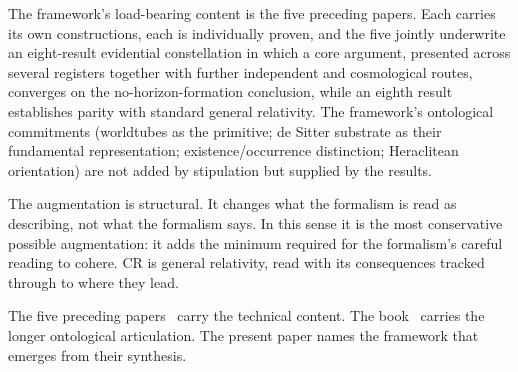 \documentclass[11pt,a4paper]{article}
\theoremstyle{definition}
\begin{document}
The framework's load-bearing content is the five preceding papers. Each carries its own constructions, each is individually proven, and the five jointly underwrite an eight-result evidential constellation in which a core argument, presented across several registers together with further independent and cosmological routes, converges on the no-horizon-formation conclusion, while an eighth result establishes parity with standard general relativity. The framework's ontological commitments (worldtubes as the primitive; de Sitter substrate as their fundamental representation; existence/occurrence distinction; Heraclitean orientation) are not added by stipulation but supplied by the results.

The augmentation is structural. It changes what the formalism is read as describing, not what the formalism says. In this sense it is the most conservative possible augmentation: it adds the minimum required for the formalism's careful reading to cohere. CR is general relativity, read with its consequences tracked through to where they lead.

The five preceding papers~\cite{JanzenBHcausality, JanzenCircle, JanzenSlicing, JanzenGroupoid, JanzenCRcosmology} carry the technical content. The book~\cite{Janzen2025} carries the longer ontological articulation. The present paper names the framework that emerges from their synthesis.
\end{document}

